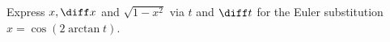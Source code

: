 Express $x, \diff x $ and $\sqrt{1-x^2}$ via $t$ and $\diff t$ for the Euler substitution $x=\cos(2\arctan t)$.
